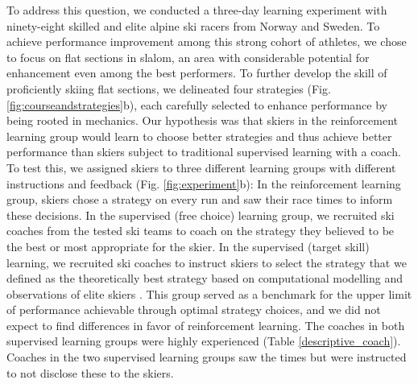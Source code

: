 \documentclass[pdflatex,sn-mathphys-num]{sn-jnl}%
\theoremstyle{thmstyleone}%
\theoremstyle{thmstyletwo}%
\theoremstyle{thmstylethree}%
\begin{document}
To address this question, we conducted a three-day learning experiment with ninety-eight skilled and elite alpine ski racers from Norway and Sweden. To achieve performance improvement among this strong cohort of athletes, we chose to focus on flat sections in slalom, an area with considerable potential for enhancement even among the best performers\cite{supej_new_2011}. To further develop the skill of proficiently skiing flat sections, we delineated four strategies (Fig. \ref{fig:courseandstrategies}b), each carefully selected to enhance performance by being rooted in mechanics. Our hypothesis was that skiers in the reinforcement learning group would learn to choose better strategies and thus achieve better performance than skiers subject to traditional supervised learning with a coach. To test this, we assigned skiers to three different learning groups with different instructions and feedback (Fig. \ref{fig:experiment}b): In the reinforcement learning group, skiers chose a strategy on every run and saw their race times to inform these decisions. In the supervised (free choice) learning group, we recruited ski coaches from the tested ski teams to coach on the strategy they believed to be the best or most appropriate for the skier. In the supervised (target skill) learning, we recruited ski coaches to instruct skiers to select the strategy that we defined as the theoretically best strategy based on computational modelling \cite{lind_physics_2013, mote_accelerations_1983, luginbuhl_identification_2023} and observations of elite skiers \cite{reid_alpine_2020, magelssen_is_2022}. This group served as a benchmark for the upper limit of performance achievable through optimal strategy choices, and we did not expect to find differences in favor of reinforcement learning. The coaches in both supervised learning groups were highly experienced (Table \ref{descriptive_coach}). Coaches in the two supervised learning groups saw the times but were instructed to not disclose these to the skiers. 
\end{document}
